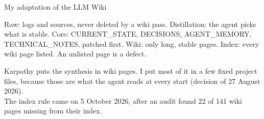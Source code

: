 \begin{frame}{My adaptation of the LLM Wiki}
  \begin{center}
  \end{center}
  \vspace{0.15em}
  {\scriptsize\color{muted}
  Raw: logs and sources, never deleted by a wiki pass.
  Distillation: the agent picks what is stable.
  Core: CURRENT\_STATE, DECISIONS, AGENT\_MEMORY, TECHNICAL\_NOTES, patched first.
  Wiki: only long, stable pages.
  Index: every wiki page listed. An unlisted page is a defect.\par}
  \vspace{0.35em}
  {\small Karpathy puts the synthesis in wiki pages. I put most of it in a few fixed project files, because those are what the agent reads at every start (decision of 27 August 2026).\\[0.3em]
  The index rule came on 5 October 2026, after an audit found 22 of 141 wiki pages missing from their index.\par}
\end{frame}

